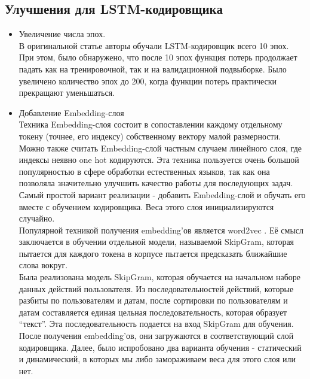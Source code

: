 \subsection{Улучшения для LSTM-кодировщика}
\begin{itemize}
	\item Увеличение числа эпох.\\
	В оригинальной статье авторы обучали LSTM-кодировщик всего 10 эпох. При этом, было обнаружено, что после 10 эпох функция потерь продолжает падать как на тренировочной, так и на валидационной подвыборке. Было увеличено количество эпох до 200, когда функции потерь практически прекращают уменьшаться.\\
	\item Добавление Embedding-слоя\\
	Техника Embedding-слоя состоит в сопоставлении каждому отдельному токену (точнее, его индексу) собственному вектору малой размерности. Можно также считать Embedding-слой частным случаем линейного слоя, где индексы неявно one hot кодируются. Эта техника пользуется очень большой популярностью в сфере обработки естественных языков, так как она позволяла значительно улучшить качество работы для последующих задач.\\
	Самый простой вариант реализации - добавить Embedding-слой и обучать его вместе с обучением кодировщика. Веса этого слоя инициализируются случайно.\\
	Популярной техникой получения embedding'ов является word2vec \cite{mikolovEfficientEstimationWord2013a}. Её смысл заключается в обучении отдельной модели, называемой SkipGram, которая пытается для каждого токена в корпусе пытается предсказать ближайшие слова вокруг.\\
	Была реализована модель SkipGram, которая обучается на начальном наборе данных действий пользователя. Из последовательностей действий, которые разбиты по пользователям и датам, после сортировки по пользователям и датам составляется единая цельная последовательность, которая образует ``текст''. Эта последовательность подается на вход SkipGram для обучения.\\


	После получения embedding'ов, они загружаются в соответствующий слой кодировщика. Далее, было испробовано два варианта обучения - статический и динамический, в которых мы либо замораживаем веса для этого слоя или нет.



\end{itemize}
